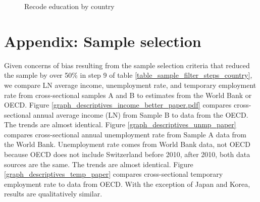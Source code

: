 \begin{figure}
    \caption{Recode education by country}
    \label{graph_descriptives_education}
\end{figure}


\clearpage
\section{Appendix: Sample selection}\label{appendix:sample_selection}
\setcounter{figure}{0}    
\setcounter{table}{0}    
\renewcommand*\thetable{\Alph{section}.\arabic{table}}
\renewcommand*\thefigure{\Alph{section}.\arabic{figure}}
\renewcommand{\theHfigure}{\Alph{section}.\arabic{table}}
\renewcommand{\theHtable}{\Alph{section}.\arabic{figure}}

Given concerns of bias resulting from the sample selection criteria that reduced the sample by over 50\% in step 9 of table \ref{table_sample_filter_steps_country}, we compare LN average income, unemployment rate, and temporary employment rate from cross-sectional samples A and B to estimates from the World Bank or OECD.  Figure \ref{graph_descriptives_income_better_paper.pdf} compares cross-sectional annual average income (LN) from Sample B to data from the OECD.  The trends are almost identical.  Figure \ref{graph_descriptives_unmp_paper} compares cross-sectional annual unemployment rate from Sample A data from the World Bank.  Unemployment rate comes from World Bank data, not OECD because OECD does not include Switzerland before 2010, after 2010, both data sources are the same.  The trends are almost identical.  Figure  \ref{graph_descriptives_temp_paper} compares cross-sectional temporary employment rate to data from OECD.  With the exception of Japan and Korea, results are qualitatively similar.

